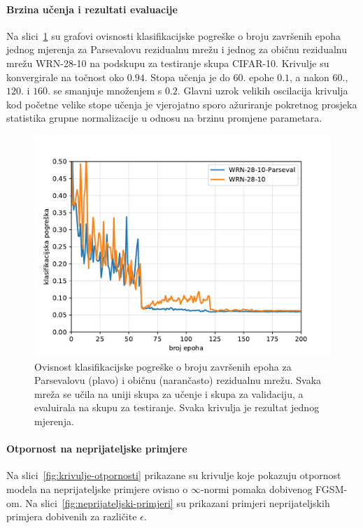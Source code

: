 \documentclass[utf8, seminar, numeric, lmodern]{feri}
\begin{document}
\paragraph{Brzina učenja i rezultati evaluacije} Na slici~\ref{fig:krivulje-pogreske-moje} su grafovi ovisnosti klasifikacijske pogreške o broju završenih epoha jednog mjerenja za Parsevalovu rezidualnu mrežu i jednog za običnu rezidualnu mrežu WRN-28-10 na podskupu za testiranje skupa CIFAR-10. Krivulje su konvergirale na točnost oko $0.94$. Stopa učenja je do $60.$ epohe $0.1$, a nakon $60.$, $120.$ i $160.$ se smanjuje množenjem s $0.2$. Glavni uzrok velikih oscilacija krivulja kod početne velike stope učenja je vjerojatno sporo ažuriranje pokretnog prosjeka statistika grupne normalizacije u odnosu na brzinu promjene parametara. 

\begin{figure}[htbp]
	\centering
	\includegraphics[width=1\linewidth]{ilustracije/grafovi/krivulje-pogreske}
	\caption{
		Ovisnost klasifikacijske pogreške o broju završenih epoha za Parsevalovu (plavo) i običnu (narančasto) rezidualnu mrežu. Svaka mreža se učila na uniji skupa za učenje i skupa za validaciju, a evaluirala na skupu za testiranje. Svaka krivulja je rezultat jednog mjerenja.
	}
	\label{fig:krivulje-pogreske-moje}
\end{figure}

\paragraph{Otpornost na neprijateljske primjere} Na slici~\ref{fig:krivulje-otpornosti} prikazane su krivulje koje pokazuju otpornost modela na neprijateljske primjere ovisno o $\infty$-normi pomaka dobivenog FGSM-om. Na slici~\ref{fig:neprijateljski-primjeri} su prikazani primjeri neprijateljskih primjera dobivenih za različite $\epsilon$.
\end{document}

